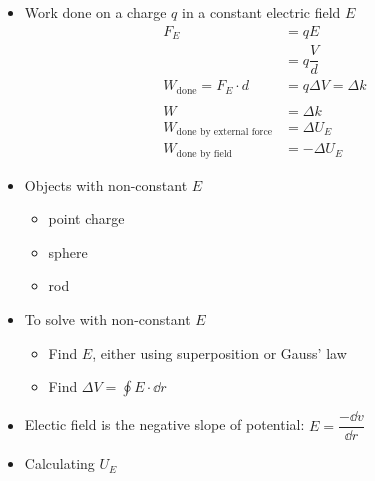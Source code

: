 \documentclass{article}
\begin{document}
    \begin{itemize}
      \item Work done on a charge $q$ in a constant electric field $E$
        \begin{align*}
          F_E&=qE\\
           &=q\dfrac{V}{d}\\
          W_\text{done}=F_E\cdot d& =q\Delta V = \Delta k\\~\\
          W&=\Delta k\\
          W_\text{done by external force}&=\Delta U_E\\
          W_\text{done by field}&=-\Delta U_E
        \end{align*}
      \item Objects with non-constant $E$
        \begin{itemize}
          \item point charge
          \item sphere
          \item rod
        \end{itemize}
      \item To solve with non-constant $E$
        \begin{itemize}
          \item Find $E$, either using superposition or Gauss' law
          \item Find $\Delta V=\oint E\cdot \dd r$
        \end{itemize}
      \item Electic field is the negative slope of potential: $E=\dfrac{- \dd v}{\dd r}$
      \item Calculating $U_E$
        \begin{figure}[H]
          \centering

\end{figure}
\end{itemize}
\end{document}
